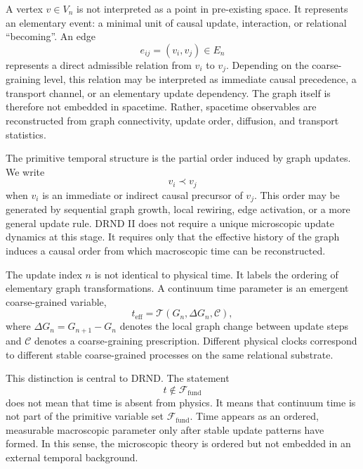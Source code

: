 \documentclass[12pt]{iopart}
\begin{document}
A vertex \(v\in V_n\) is not interpreted as a point in pre-existing space. It represents an elementary event: a minimal unit of causal update, interaction, or relational ``becoming''. An edge
\begin{equation}
e_{ij}=(v_i,v_j)\in E_n
\end{equation}
represents a direct admissible relation from \(v_i\) to \(v_j\). Depending on the coarse-graining level, this relation may be interpreted as immediate causal precedence, a transport channel, or an elementary update dependency. The graph itself is therefore not embedded in spacetime. Rather, spacetime observables are reconstructed from graph connectivity, update order, diffusion, and transport statistics.

The primitive temporal structure is the partial order induced by graph updates. We write
\begin{equation}
v_i\prec v_j
\end{equation}
when \(v_i\) is an immediate or indirect causal precursor of \(v_j\). This order may be generated by sequential graph growth, local rewiring, edge activation, or a more general update rule. DRND II does not require a unique microscopic update dynamics at this stage. It requires only that the effective history of the graph induces a causal order from which macroscopic time can be reconstructed.

The update index \(n\) is not identical to physical time. It labels the ordering of elementary graph transformations. A continuum time parameter is an emergent coarse-grained variable,
\begin{equation}
t_{\mathrm{eff}}
=
\mathcal{T}(G_n,\Delta G_n,\mathcal{C}),
\end{equation}
where \(\Delta G_n=G_{n+1}-G_n\) denotes the local graph change between update steps and \(\mathcal{C}\) denotes a coarse-graining prescription. Different physical clocks correspond to different stable coarse-grained processes on the same relational substrate.

This distinction is central to DRND. The statement
\begin{equation}
t\notin\mathcal{F}_{\mathrm{fund}}
\end{equation}
does not mean that time is absent from physics. It means that continuum time is not part of the primitive variable set \(\mathcal{F}_{\mathrm{fund}}\). Time appears as an ordered, measurable macroscopic parameter only after stable update patterns have formed. In this sense, the microscopic theory is ordered but not embedded in an external temporal background.
\end{document}
